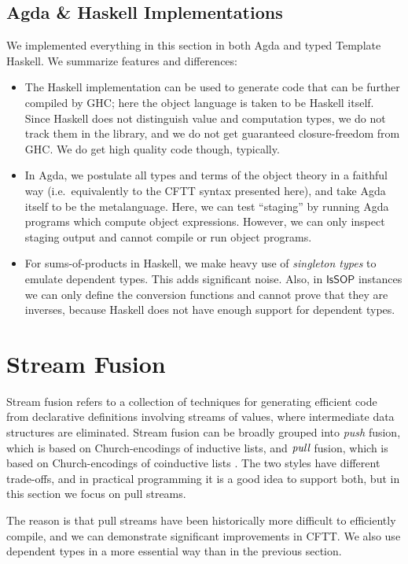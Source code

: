\documentclass[acmsmall,screen,review,anonymous]{acmart}
\newcommand{\msf}[1]{{\mathsf{#1}}}
\newcommand{\IsSOP}{\msf{IsSOP}}
\theoremstyle{remark}
\begin{document}
\subsection{Agda \& Haskell Implementations}

We implemented everything in this section in both Agda and typed Template
Haskell. We summarize features and differences:
\begin{itemize}
\item The Haskell implementation can be used to generate code that can be
      further compiled by GHC; here the object language is taken to be Haskell
      itself. Since Haskell does not distinguish value and computation types, we do
      not track them in the library, and we do not get guaranteed closure-freedom
      from GHC. We do get high quality code though, typically.
\item In Agda, we postulate all types and terms of the object theory in a
  faithful way (i.e.\ equivalently to the CFTT syntax presented here), and take
  Agda itself to be the metalanguage. Here, we can test ``staging'' by running Agda
  programs which compute object expressions. However, we can only inspect
  staging output and cannot compile or run object programs.
\item For sums-of-products in Haskell, we make heavy use of \emph{singleton
  types} \cite{TODO} to emulate dependent types. This adds significant
  noise. Also, in $\IsSOP$ instances we can only define the conversion functions
  and cannot prove that they are inverses, because Haskell does not have enough support
  for dependent types.
\end{itemize}

\section{Stream Fusion}

Stream fusion refers to a collection of techniques for generating efficient code
from declarative definitions involving streams of values, where intermediate
data structures are eliminated. Stream fusion can be broadly grouped into \emph{push}
fusion, which is based on Church-encodings of inductive lists, and $\emph{pull}$
fusion, which is based on Church-encodings of coinductive lists \cite{TODO}. The
two styles have different trade-offs, and in practical programming it is a good
idea to support both, but in this section we focus on pull streams.

The reason is that pull streams have been historically more difficult to
efficiently compile, and we can demonstrate significant improvements in CFTT.
We also use dependent types in a more essential way than in the previous
section.
\end{document}
